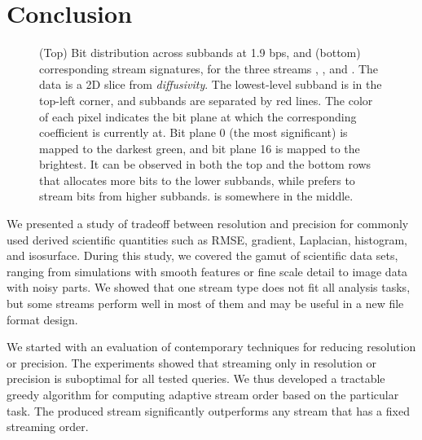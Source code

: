 \section{Conclusion}

\begin{figure}[t]
\centering
 
\caption{(Top) Bit distribution across subbands at 1.9 bps, and (bottom) corresponding stream
signatures, for the three streams \ssig, \slsg, and \shsg. The data is a 2D slice from
\emph{diffusivity}. The lowest-level subband is in the top-left corner, and subbands are separated
by red lines. The color of each pixel indicates the bit plane at which the corresponding coefficient
is currently at. Bit plane 0 (the most significant) is mapped to the darkest green, and bit plane 16
is mapped to the brightest. It can be observed in both the top and the bottom rows that \shsg
allocates more bits to the lower subbands, while \slsg prefers to stream bits from higher subbands.
\ssig is somewhere in the middle.}
\label{fig:bit-distrib}
\end{figure}

We presented a study of tradeoff between resolution and precision for commonly used derived
scientific quantities such as RMSE, gradient, Laplacian, histogram, and isosurface.
During this study, we covered the gamut of scientific data sets, ranging from simulations
with smooth features or fine scale detail to image data with noisy parts.
We showed that one stream type does not fit all analysis tasks, but some streams perform well
in most of them and may be useful in a new file format design.





We started with an evaluation of contemporary techniques for reducing resolution or precision.
The experiments showed that streaming only in resolution or precision is suboptimal for all
tested queries. We thus developed a tractable greedy algorithm for computing adaptive stream order
based on the particular task. The produced stream significantly outperforms any stream that has
a fixed streaming order.

